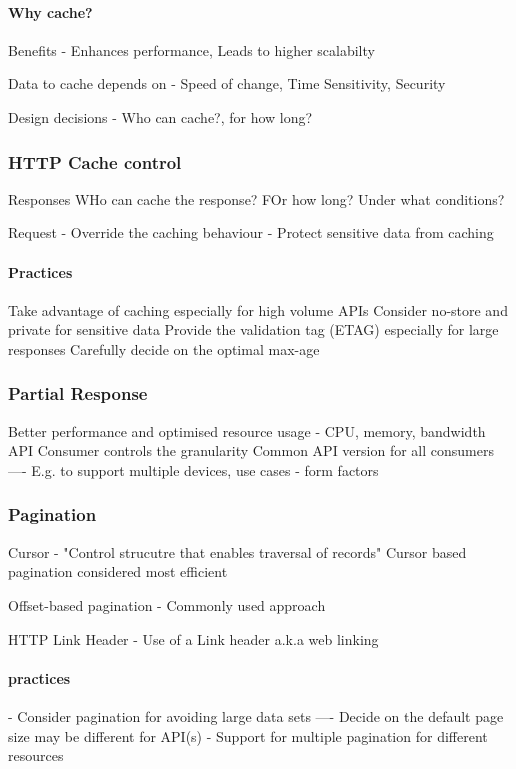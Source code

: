 \documentclass[a4paper, 11pt]{book}
\begin{document}
    \paragraph{Why cache?}
    Benefits - Enhances performance, Leads to higher scalabilty

    Data to cache depends on - Speed of change, Time Sensitivity, Security

    Design decisions - Who can cache?, for how long?

    \subsubsection{HTTP Cache control}
    Responses
    WHo can cache the response?
    FOr how long?
    Under what conditions?

    Request
    - Override the caching behaviour
    - Protect sensitive data from caching

    \paragraph{Practices}
    Take advantage of caching especially for high volume APIs
    Consider no-store and private for sensitive data
    Provide the validation tag (ETAG) especially for large responses
    Carefully decide on the optimal max-age

    \subsubsection{Partial Response}
    Better performance and optimised resource usage - CPU, memory, bandwidth
    API Consumer controls the granularity
    Common API version for all consumers
    ---- E.g. to support multiple devices, use cases - form factors

    \subsubsection{Pagination}
    Cursor - "Control strucutre that enables traversal of records"
    Cursor based pagination considered most efficient

    Offset-based pagination - Commonly used approach %

    HTTP Link Header - Use of a Link header a.k.a web linking

    \paragraph{practices}
    - Consider pagination for avoiding large data sets
    ---- Decide on the default page size may be different for API(s)
    - Support for multiple pagination for different resources
\end{document}
